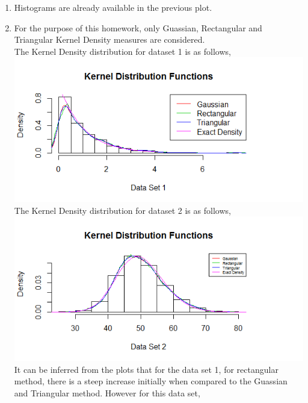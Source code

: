 \documentclass{article}
\begin{document}
\begin{enumerate}
\begin{enumerate}
\begin{enumerate}
\end{enumerate}
\item Histograms are already available in the previous plot.
\item For the purpose of this homework, only Guassian, Rectangular and Triangular Kernel Density measures are considered.
\\The Kernel Density distribution for dataset 1 is as follows,\\
\includegraphics[scale=0.5]{kernel1}
\\The Kernel Density distribution for dataset 2 is as follows,\\
\includegraphics[scale=0.5]{kernel2}
It can be inferred from the plots that for the data set 1, for rectangular method, there is a steep increase initially when compared to the Guassian and Triangular method. However for this data set,	
\end{enumerate}
\end{enumerate}
\end{document}
